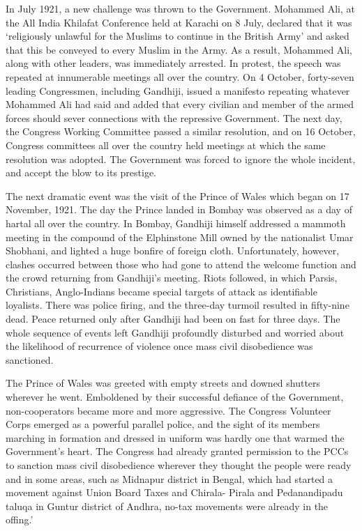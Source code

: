 \begin{multicols}{2}
In July 1921, a new challenge was thrown to the Government. Mohammed Ali, at the All India Khilafat Conference held at Karachi on 8 July, declared that it was `religiously unlawful for the Muslims to continue in the British Army' and asked that this be conveyed to every Muslim in the Army. As a result, Mohammed Ali, along with other leaders, was immediately arrested. In protest, the speech was repeated at innumerable meetings all over the country. On 4 October, forty-seven leading Congressmen, including Gandhiji, issued a manifesto repeating whatever Mohammed Ali had said and added that every civilian and member of the armed forces should sever connections with the repressive Government. The next day, the Congress Working Committee passed a similar resolution, and on 16 October, Congress committees all over the country held meetings at which the same resolution was adopted. The Government was forced to ignore the whole incident, and accept the blow to its prestige. 

The next dramatic event was the visit of the Prince of Wales which began on 17 November, 1921. The day the Prince landed in Bombay was observed as a day of hartal all over the country. In Bombay, Gandhiji himself addressed a mammoth meeting in the compound of the Elphinstone Mill owned by the nationalist Umar Shobhani, and lighted a huge bonfire of foreign cloth. Unfortunately, however, clashes occurred between those who had gone to attend the welcome function and the crowd returning from Gandhiji's meeting. Riots followed, in which Parsis, Christians, Anglo-Indians became special targets of attack as identifiable loyalists. There was police firing, and the three-day turmoil resulted in fifty-nine dead. Peace returned only after Gandhiji had been on fast for three days. The whole sequence of events left Gandhiji profoundly disturbed and worried about the likelihood of recurrence of violence once mass civil disobedience was sanctioned. 

The Prince of Wales was greeted with empty streets and downed shutters wherever he went. Emboldened by their successful defiance of the Government, non-cooperators became more and more aggressive. The Congress Volunteer Corps emerged as a powerful parallel police, and the sight of its members marching in formation and dressed in uniform was hardly one that warmed the Government's heart. The Congress had already granted permission to the PCCs to sanction mass civil disobedience wherever they thought the people were ready and in some areas, such as Midnapur district in Bengal, which had started a movement against Union Board Taxes and Chirala- Pirala and Pedanandipadu taluqa in Guntur district of Andhra, no-tax movements were already in the offing.' 


\end{multicols}
